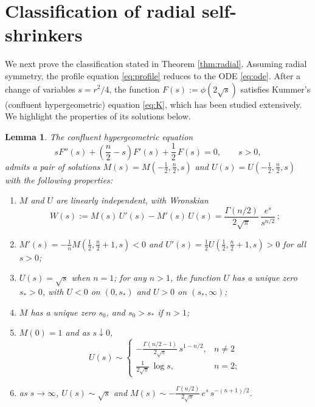 \documentclass[11pt]{article}
\numberwithin{equation}{section}
\newtheorem{lemma}[theorem]{Lemma}
\theoremstyle{definition}
\begin{document}
\section{Classification of radial self-shrinkers}\label{sec:radial}

We next prove the classification stated in Theorem \ref{thm:radial}.
Assuming radial symmetry, the profile equation \eqref{eq:profile} reduces to the ODE \eqref{eq:ode}.
After a change of variables $s = r^2/4$, the function $F(s) := \phi(2\sqrt{s})$ satisfies Kummer's (confluent hypergeometric) equation \eqref{eq:K}, which has been studied extensively. We highlight the properties of its solutions below.

\begin{lemma}\label{lem:MU}
The confluent hypergeometric equation
\begin{equation}\label{eq:K}
sF''(s) + \left(\frac{n}{2}-s \right)F'(s) + \frac{1}{2}\,F(s) = 0, \qquad s > 0,\tag{K}
\end{equation}
admits a pair of solutions $M(s)=M(-\tfrac{1}{2},\tfrac{n}{2},s)$ and $U(s)=U(-\tfrac{1}{2},\tfrac{n}{2},s)$ with the following properties:
\begin{enumerate}
\item[\textup{(i)}] $M$ and $U$ are linearly independent, with Wronskian
\[
W(s) := M(s)\,U'(s) - M'(s)\,U(s) = 
\frac{\Gamma(n/2)}{2\sqrt{\pi}}\,\frac{e^s}{s^{n/2}}\,;
\]
\item[\textup{(ii)}] $M'(s) = -\frac1n M(\tfrac{1}{2},\tfrac{n}{2}+1,s) < 0$ and $U'(s) = \frac12 U(\frac12, \frac{n}{2}+1,s) > 0$ for all $s > 0$;
\item[\textup{(iii)}] $U(s) = \sqrt{s}$ when $n=1$; for any $n>1$, the function $U$ has a unique zero $s_* > 0$, with $U < 0$ on $(0,s_*)$ and $U > 0$ on $(s_*,\infty)$;
\item[\textup{(iv)}] $M$ has a unique zero $s_0$, and $s_0 > s_*$ if $n>1$;
\item[\textup{(v)}] $M(0) = 1$ and as $s \downarrow 0$,
\[ U(s) \sim \left\{\begin{array}{ll}
    -\frac{\Gamma(n/2-1)}{2\sqrt{\pi}}\,s^{1-n/2}, & n \neq 2 \\
    \frac{1}{2\sqrt{\pi}}\,\log s, & n=2;
\end{array} 
\right. \]
\item[\textup{(vi)}] as $s \to \infty$, $U(s) \sim \sqrt{s}$ and $M(s) \sim -\frac{\Gamma(n/2)}{2\sqrt{\pi}}\,e^{s}\,s^{-(n+1)/2}$.
\end{enumerate}
\end{lemma}
\end{document}
